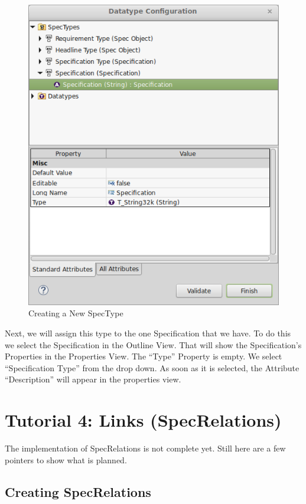\begin{figure}[H]
\centering      
\includegraphics[width=0.8\linewidth]{../rmf-images/new_spectype.png}      
\caption{Creating a New SpecType}      
\label{fig:newSpecType}
\end{figure}

Next, we will assign this type to the one Specification that we have.  To do this we select the Specification in the Outline View.  That will show
the Specification's Properties in the Properties View.  The ``Type'' Property is empty.  We select ``Specification Type'' from the drop down.
As soon as it is selected, the Attribute ``Description'' will appear in the properties view.

\section{Tutorial 4: Links (SpecRelations)}

The implementation of SpecRelations is not complete yet.  Still here are a few pointers to show what is planned.

\subsection{Creating SpecRelations}

